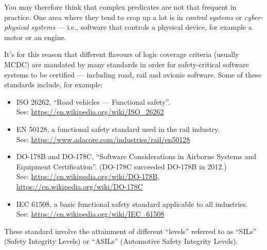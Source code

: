 You may therefore think that complex predicates are not that frequent in
practice. One area where they tend to crop up a lot is in {\it control systems}
or {\it cyber-physical systems} --- i.e., software that controls a physical
device, for example a motor or an engine.

It's for this reason that different flavours of logic coverage criteria (usually
MCDC) are mandated by many standards in order for safety-critical software
systems to be certified --- including road, rail and avionic software. Some of
these standards include, for example:



\begin{itemize}

    \item ISO 26262, ``Road vehicles --- Functional safety''.\\
    See: \url{https://en.wikipedia.org/wiki/ISO_26262}

    \item EN 50128, a functional safety standard used in the rail industry.\\
    See: \url{https://www.adacore.com/industries/rail/en50128}

    \item DO-178B and DO-178C, ``Software Considerations in Airborne Systems and Equipment
    Certification''. (DO-178C succeeded DO-178B in 2012.)\\
    See: \url{https://en.wikipedia.org/wiki/DO-178B}, \url{https://en.wikipedia.org/wiki/DO-178C}

    \item IEC 61508, a basic functional safety standard applicable to all
    industries.\\
    See: \url{https://en.wikipedia.org/wiki/IEC_61508}
    
\end{itemize}

These standard involve the attainment of different ``levels'' referred to as
``SILs'' (Safety Integrity Levels) or ``ASILs'' (Automotive Safety Integrity
Levels).

